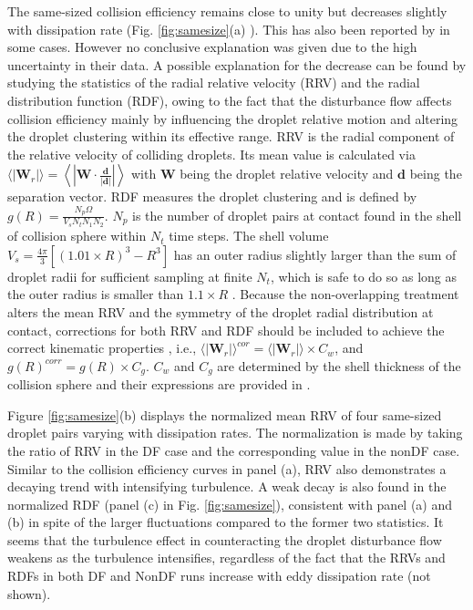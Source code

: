 The same-sized collision efficiency remains close to unity but decreases slightly with dissipation rate (Fig. \ref{fig:samesize}(a) ). This has also been reported by \citet{Wang2008} in some cases. However no conclusive explanation was given due to the high uncertainty in their data. A possible explanation for the decrease can be found by studying the statistics of the radial relative velocity (RRV) and the radial distribution function (RDF), owing to the fact that the disturbance flow affects collision efficiency mainly by influencing the droplet relative motion and altering the droplet clustering within its effective range. RRV is the radial component of the relative velocity of colliding droplets. Its mean value is calculated via $\langle |\mathbf{W}_r | \rangle = \left\langle \left| \mathbf{W} \cdot \frac{\mathbf{d}}{|\mathbf{d}|} \right| \right\rangle $ with $\mathbf{W}$ being the droplet relative velocity and $\mathbf{d}$ being the separation vector. RDF measures the droplet clustering and is defined by $g(R)=\frac{N_p \Omega}{V_s N_t N_1 N_2}$. $N_p$ is the number of droplet pairs at contact found in the shell of collision sphere within $N_t$ time steps. The shell volume $V_s=\frac{4\pi}{3} [(1.01\times R)^3-R^3]$ has an outer radius slightly larger than the sum of droplet radii for sufficient sampling at finite $N_t$, which is safe to do so as long as the outer radius is smaller than $1.1 \times R$ \citep{Wang2000}. Because the non-overlapping treatment alters the mean RRV and the symmetry of the droplet radial distribution at contact, corrections for both RRV and RDF should be included to achieve the correct kinematic properties \citep{Wang2005b}, i.e., $\langle |\mathbf{W}_r|\rangle^{cor}=\langle|\mathbf{W}_r |\rangle \times C_w$, and $g(R)^{corr}=g(R)\times C_g$. $C_w$ and $C_g$ are determined by the shell thickness of the collision sphere and their expressions are provided in \citet{Wang2005b}.

Figure \ref{fig:samesize}(b) displays the normalized mean RRV of four same-sized droplet pairs varying with dissipation rates. The normalization is made by taking the ratio of RRV in the DF case and the corresponding value in the nonDF case. Similar to the collision efficiency curves in panel (a), RRV also demonstrates a decaying trend with intensifying turbulence. A weak decay is also found in the normalized RDF (panel (c) in Fig. \ref{fig:samesize}), consistent with panel (a) and (b) in spite of the larger fluctuations compared to the former two statistics. It seems that the turbulence effect in counteracting the droplet disturbance flow weakens as the turbulence intensifies, regardless of the fact that the RRVs and RDFs in both DF and NonDF runs increase with eddy dissipation rate (not shown). 

